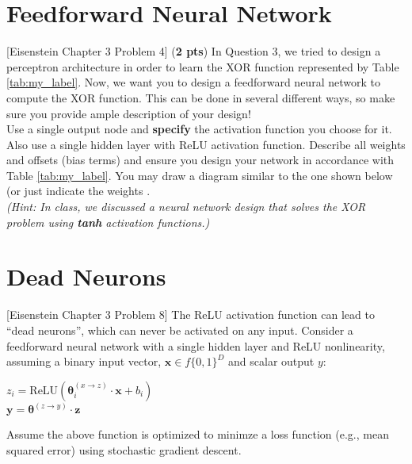 \documentclass[11pt, letterpaper]{article}
\begin{document}
\bigskip

\newpage
\section{Feedforward Neural Network}
    
    [Eisenstein Chapter 3 Problem 4] (\textbf{2 pts}) In Question 3, we tried to design a perceptron architecture in order to learn the XOR function represented by Table \ref{tab:my_label}. Now, we want you to design a feedforward neural network to compute the XOR function. This can be done in several different ways, so make sure you provide ample description of your design!\\
    
    \noindent Use a single output node and \textbf{specify} the activation function you choose for it. Also use a single hidden layer with ReLU activation function.  Describe all weights and offsets (bias terms) and ensure you design your network in accordance with Table \ref{tab:my_label}. You may draw a diagram similar to the one shown below (or just indicate the weights .\\
    
    \noindent \textit{(Hint: In class, we discussed a neural network design that solves the XOR problem using \textbf{tanh} activation functions.)}
    
    \newpage
    \section{Dead Neurons}
        
    [Eisenstein Chapter 3 Problem 8] The ReLU activation function can lead to ``dead neurons'', which can never be activated on any input. Consider a feedforward neural network with a single hidden layer and ReLU nonlinearity, assuming a binary input vector, $\mathbf{x} \in f\{0,1\}^D$  and scalar output $y$:
    \begin{center}
    $z_i = \text{ReLU}(\mathbf{\theta}_i^{(x \rightarrow z)} \cdot \mathbf{x} + b_i)$ \\
    $\mathbf{y} = \mathbf{\theta}^{(z \rightarrow y)} \cdot \mathbf{z}$
    \end{center}
    
    Assume the above function is optimized to minimze a loss function (e.g., mean squared error) using stochastic gradient descent. 
    
\end{document}
